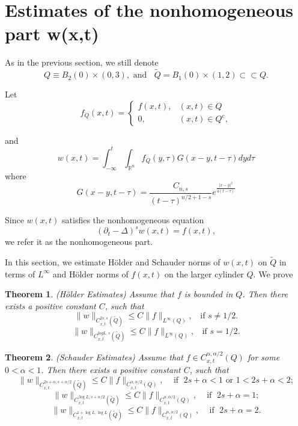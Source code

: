 \documentclass[12pt]{article}
\newtheorem{theorem}{Theorem}[section]
\theoremstyle{remark}
\numberwithin{equation}{section}
\begin{document}
\section{Estimates of the nonhomogeneous part w(x,t)}

As in the previous section, we still denote
$$ Q \equiv B_2(0) \times (0,3), \mbox{ and } \; \; \tilde{Q} = B_1(0) \times (1,2) \subset \subset Q.$$



Let
$$ f_Q (x,t) = \left\{ \begin{array}{ll} f(x,t), & (x,t) \in Q \\
0, & (x, t) \in Q^c,
\end{array}
\right.
$$

and
$$w(x,t) = \int_{-\infty}^t \int_{\mathbb{R}^n} f_Q(y,\tau) G(x-y, t-\tau) dy d\tau$$
where
$$G(x-y, t-\tau) = \frac{C_{n,s}}{(t-\tau)^{n/2+1-s}} e^{\frac{|x-y|^2}{4(t-\tau)}}$$

Since $w(x,t)$ satisfies the nonhomogeneous equation
$$(\partial_t - \Delta)^s w(x,t) = f(x,t),$$
we refer it as the nonhomogeneous part.
\smallskip

In this section, we estimate H\"{o}lder and Schauder norms of $w(x,t)$ on $\tilde{Q}$ in terms of $L^\infty$ and H\"{o}lder norms of $f(x,t)$ on the larger cylinder $Q$. We prove

\begin{theorem} \label{thm3.1}  (H\"{o}lder Estimates) Assume that $f$ is bounded in $Q$. Then there exists a positive constant $C$, such that
$$
\|w\|_{C^{2s, s}_{x, t} (\tilde{Q})} \leq C \|f\|_{L^\infty (Q)}, \;\; \mbox{ if } s \neq 1/2.
$$
$$
\|w\|_{C^{log L, s}_{x, t} (\tilde{Q})} \leq C \|f\|_{L^\infty (Q)}, \;\; \mbox{ if } s = 1/2.
$$
\end{theorem}

\begin{theorem} \label{thm3.2} (Schauder Estimates) Assume that $f \in C^{\alpha, \alpha/2}_{x,t}  (Q)$ for some $0 < \alpha < 1$. Then there exists a positive constant $C$, such that
$$
\|w\|_{C^{2s+ \alpha, s+\alpha/2}_{x, t} (\tilde{Q})} \leq C \|f\|_{C^{\alpha, \alpha/2}_{x,t}  (Q)}, \; \; \; \mbox{ if } \; 2s +\alpha < 1 \mbox{ or } 1< 2s +\alpha < 2;
$$
$$
\|w\|_{C^{\log L, s+\alpha/2}_{x, t} (\tilde{Q})} \leq C \|f\|_{C^{\alpha, \alpha/2}_{x,t}  (Q)}, \; \; \; \mbox{ if } \; 2s + \alpha = 1;
$$
$$
\|w\|_{C^{1+\log L, \log L}_{x, t} (\tilde{Q})} \leq C \|f\|_{C^{\alpha, \alpha/2}_{x,t}  (Q)}, \;\;\; \mbox{ if } \; 2s + \alpha = 2.
$$
\end{theorem}
\end{document}
